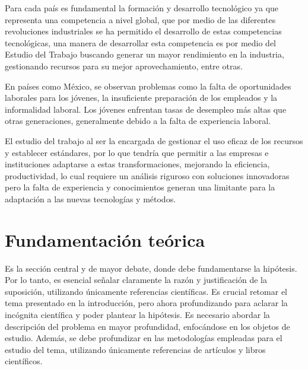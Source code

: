     Para cada país es fundamental la formación y desarrollo tecnológico ya que representa una competencia a nivel global, que por medio de las diferentes revoluciones industriales se ha permitido el desarrollo de estas competencias tecnológicas, una manera de desarrollar esta competencia es por medio del Estudio del Trabajo buscando generar un mayor rendimiento en la industria, gestionando recursos para su mejor aprovechamiento, entre otras.
    
    En países como México, se observan problemas como la falta de oportunidades laborales para los jóvenes, la insuficiente preparación de los empleados y la informalidad laboral. Los jóvenes enfrentan tasas de desempleo más altas que otras generaciones, generalmente debido a la falta de experiencia laboral.
    
    El estudio del trabajo al ser la encargada de gestionar el uso eficaz de los recursos y establecer estándares, por lo que tendría que permitir a las empresas e instituciones adaptarse a estas transformaciones, mejorando la eficiencia, productividad, lo cual requiere un análisis riguroso con soluciones innovadoras pero la falta de experiencia y conocimientos generan una limitante para la adaptación a las nuevas tecnologías y métodos.
    \section{Fundamentación teórica}
    
    Es la sección central y de mayor debate, donde debe fundamentarse la hipótesis. Por lo tanto, es esencial señalar claramente la razón y justificación de la suposición, utilizando únicamente referencias científicas. Es crucial retomar el tema presentado en la introducción, pero ahora profundizando para aclarar la incógnita científica y poder plantear la hipótesis. Es necesario abordar la descripción del problema en mayor profundidad, enfocándose en los objetos de estudio. Además, se debe profundizar en las metodologías empleadas para el estudio del tema, utilizando únicamente referencias de artículos y libros científicos.
    
